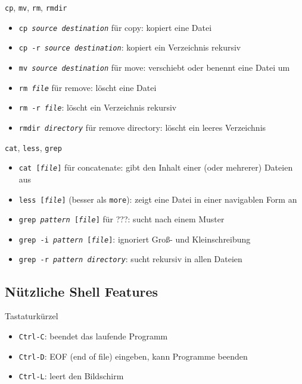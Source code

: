 \begin{frame}{\texttt{cp}, \texttt{mv}, \texttt{rm}, \texttt{rmdir}}
  \begin{itemize}
    \item \texttt{cp \textit{source} \textit{destination}} für copy: kopiert eine Datei
    \item \texttt{cp -r \textit{source} \textit{destination}}: kopiert ein Verzeichnis rekursiv
    \item \texttt{mv \textit{source} \textit{destination}} für move: verschiebt oder benennt eine Datei um
    \item \texttt{rm \textit{file}} für remove: löscht eine Datei
    \item \texttt{rm -r \textit{file}}: löscht ein Verzeichnis rekursiv
    \item \texttt{rmdir \textit{directory}} für remove directory: löscht ein leeres Verzeichnis
  \end{itemize}
\end{frame}

\begin{frame}{\texttt{cat}, \texttt{less}, \texttt{grep}}
  \begin{itemize}
    \item \texttt{cat [\textit{file}]} für concatenate: gibt den Inhalt einer (oder mehrerer) Dateien aus
    \item \texttt{less [\textit{file}]} (besser als \texttt{more}): zeigt eine Datei in einer navigablen Form an
    \item \texttt{grep \textit{pattern} [\textit{file}]} für ???: sucht nach einem Muster
    \item \texttt{grep -i \textit{pattern} [\textit{file}]}: ignoriert Groß- und Kleinschreibung
    \item \texttt{grep -r \textit{pattern} \textit{directory}}: sucht rekursiv in allen Dateien
  \end{itemize}
\end{frame}

\subsection{Nützliche Shell Features}
\begin{frame}{Tastaturkürzel}
  \begin{itemize}
    \item \texttt{Ctrl-C}: beendet das laufende Programm
    \item \texttt{Ctrl-D}: EOF (end of file) eingeben, kann Programme beenden
    \item \texttt{Ctrl-L}: leert den Bildschirm
  \end{itemize}
\end{frame}

